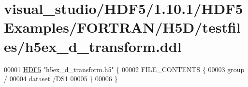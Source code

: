 \hypertarget{visual__studio_2_h_d_f5_21_810_81_2_h_d_f5_examples_2_f_o_r_t_r_a_n_2_h5_d_2testfiles_2h5ex__d__transform_8ddl_source}{}\section{visual\+\_\+studio/\+H\+D\+F5/1.10.1/\+H\+D\+F5\+Examples/\+F\+O\+R\+T\+R\+A\+N/\+H5\+D/testfiles/h5ex\+\_\+d\+\_\+transform.ddl}
\label{visual__studio_2_h_d_f5_21_810_81_2_h_d_f5_examples_2_f_o_r_t_r_a_n_2_h5_d_2testfiles_2h5ex__d__transform_8ddl_source}

\begin{DoxyCode}
00001 \hyperlink{namespace_h_d_f5}{HDF5} \textcolor{stringliteral}{"h5ex\_d\_transform.h5"} \{
00002 FILE\_CONTENTS \{
00003  group      /
00004  dataset    /DS1
00005  \}
00006 \}
\end{DoxyCode}
